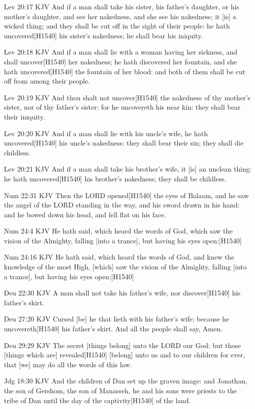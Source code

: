 \documentclass{book}
\begin{document}
Lev 20:17 KJV
And if a man shall take his sister, his father's daughter, or his mother's daughter, and see her nakedness, and she see his nakedness; it [is] a wicked thing; and they shall be cut off in the sight of their people: he hath uncovered[H1540] his sister's nakedness; he shall bear his iniquity.

Lev 20:18 KJV
And if a man shall lie with a woman having her sickness, and shall uncover[H1540] her nakedness; he hath discovered her fountain, and she hath uncovered[H1540] the fountain of her blood: and both of them shall be cut off from among their people.

Lev 20:19 KJV
And thou shalt not uncover[H1540] the nakedness of thy mother's sister, nor of thy father's sister: for he uncovereth his near kin: they shall bear their iniquity.

Lev 20:20 KJV
And if a man shall lie with his uncle's wife, he hath uncovered[H1540] his uncle's nakedness: they shall bear their sin; they shall die childless.

Lev 20:21 KJV
And if a man shall take his brother's wife, it [is] an unclean thing: he hath uncovered[H1540] his brother's nakedness; they shall be childless.

Num 22:31 KJV
Then the LORD opened[H1540] the eyes of Balaam, and he saw the angel of the LORD standing in the way, and his sword drawn in his hand: and he bowed down his head, and fell flat on his face.

Num 24:4 KJV
He hath said, which heard the words of God, which saw the vision of the Almighty, falling [into a trance], but having his eyes open:[H1540]

Num 24:16 KJV
He hath said, which heard the words of God, and knew the knowledge of the most High, [which] saw the vision of the Almighty, falling [into a trance], but having his eyes open:[H1540]

Deu 22:30 KJV
A man shall not take his father's wife, nor discover[H1540] his father's skirt.

Deu 27:20 KJV
Cursed [be] he that lieth with his father's wife; because he uncovereth[H1540] his father's skirt. And all the people shall say, Amen.

Deu 29:29 KJV
The secret [things belong] unto the LORD our God: but those [things which are] revealed[H1540] [belong] unto us and to our children for ever, that [we] may do all the words of this law.

Jdg 18:30 KJV
And the children of Dan set up the graven image: and Jonathan, the son of Gershom, the son of Manasseh, he and his sons were priests to the tribe of Dan until the day of the captivity[H1540] of the land.
\end{document}
